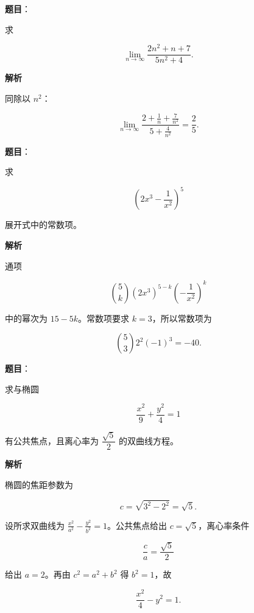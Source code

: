 \begin{answer}

\textbf{题目}：

求

\nopagebreak[4]
\[
\lim_{n\to\infty}\frac{2n^2+n+7}{5n^2+4}.
\]

\textbf{解析}

同除以 $n^2$：

\nopagebreak[4]
\[
\lim_{n\to\infty}
\frac{2+\frac1n+\frac7{n^2}}{5+\frac4{n^2}}
=\frac25.
\]


\end{answer}
\begin{answer}

\textbf{题目}：

求

\nopagebreak[4]
\[
\left(2x^3-\frac1{x^2}\right)^5
\]

展开式中的常数项。

\textbf{解析}

通项

\nopagebreak[4]
\[
\binom5k(2x^3)^{5-k}\left(-\frac1{x^2}\right)^k
\]

中的幂次为 $15-5k$。常数项要求 $k=3$，所以常数项为

\nopagebreak[4]
\[
\binom53 2^2(-1)^3=-40.
\]


\end{answer}
\begin{answer}

\textbf{题目}：

求与椭圆

\nopagebreak[4]
\[
\frac{x^2}{9}+\frac{y^2}{4}=1
\]

有公共焦点，且离心率为 $\dfrac{\sqrt5}{2}$ 的双曲线方程。

\textbf{解析}

椭圆的焦距参数为

\nopagebreak[4]
\[
c=\sqrt{3^2-2^2}=\sqrt5.
\]

设所求双曲线为 $\frac{x^2}{a^2}-\frac{y^2}{b^2}=1$。公共焦点给出 $c=\sqrt5$，离心率条件

\nopagebreak[4]
\[
\frac ca=\frac{\sqrt5}{2}
\]

给出 $a=2$。再由 $c^2=a^2+b^2$ 得 $b^2=1$，故

\nopagebreak[4]
\[
\frac{x^2}{4}-y^2=1.
\]


\end{answer}
